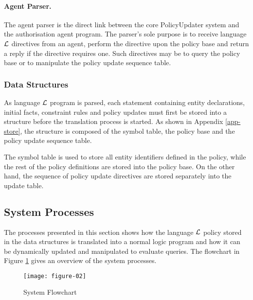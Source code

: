 \documentclass[global,twocolumn,final]{svjour}
\begin{document}
        \paragraph{Agent Parser.}

          The agent parser is the direct link between the core PolicyUpdater
          system and the authorisation agent program. The parser's sole purpose
          is to receive language $\cal{L}$ directives from an agent, perform
          the directive upon the policy base and return a reply if the
          directive requires one. Such directives may be to query the policy
          base or to manipulate the policy update sequence table.

      \subsubsection{Data Structures}

        As language ${\cal L}$ program is parsed, each statement containing
        entity declarations, initial facts, constraint rules and policy
        updates must first be stored into a structure before the translation
        process is started. As shown in Appendix \ref{app-store}, the structure
        is composed of the symbol table, the policy base and the policy update
        sequence table.

        The symbol table is used to store all entity identifiers defined in the
        policy, while the rest of the policy definitions are stored into the
        policy base. On the other hand, the sequence of policy update
        directives are stored separately into the update table.

    \subsection{System Processes}

      The processes presented in this section shows how the language
      ${\cal L}$ policy stored in the data structures is translated into a
      normal logic program and how it can be dynamically updated and
      manipulated to evaluate queries. The flowchart in Figure \ref{fig-2}
      gives an overview of the system processes.

      \begin{figure}[ht]
        \begin{center}
          \texttt{[image: figure-02]}
          \caption{System Flowchart}
          \label{fig-2}
        \end{center}
      \end{figure}
\end{document}
